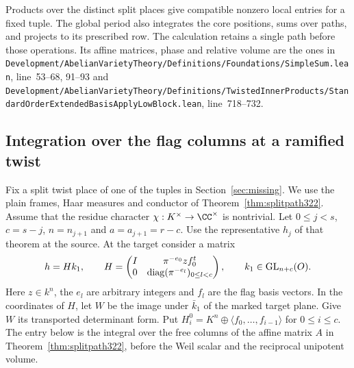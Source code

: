 \documentclass[a4paper,11pt]{article}
\theoremstyle{definition}
\theoremstyle{remark}
\newcommand{\srcloc}[2]{{\small\nolinkurl{#1.lean}}, line~#2}
\numberwithin{equation}{section}
\begin{document}
Products over the distinct split places give compatible
nonzero local entries for a fixed tuple. The global period
also integrates the core positions, sums over paths, and
projects to its prescribed row. The calculation retains a
single path before those operations. Its affine matrices,
phase and relative volume are the ones in
\srcloc{Development/AbelianVarietyTheory/Definitions/Foundations/SimpleSum}{53--68, 91--93}
and \srcloc{Development/AbelianVarietyTheory/Definitions/TwistedInnerProducts/StandardOrderExtendedBasisApplyLowBlock}{718--732}.

\subsection{Integration over the flag columns at a ramified twist}\label{nav:VI-66}
Fix a split twist place of one of the tuples in
Section~\ref{sec:missing}. We use the plain frames, Haar
measures and conductor of Theorem~\ref{thm:splitpath322}.
Assume that the residue character \(\chi:K^\times\to\CC^\times\)
is nontrivial. Let \(0\le j<s\), \(c=s-j\), \(n=n_{j+1}\)
and \(a=a_{j+1}=r-c\). Use the representative \(h_j\) of
that theorem at the source. At the target consider a matrix
\[
 h=H k_1,\qquad
 H=\begin{pmatrix}I&\pi^{-e_0}z f_0^t\\
                 0&\operatorname{diag}(\pi^{-e_l})_{0\le l<c}
   \end{pmatrix},\qquad k_1\in{\rm GL}_{n+c}(O).
\]
Here \(z\in k^n\), the \(e_l\) are arbitrary integers and
\(f_l\) are the flag basis vectors. In the coordinates of
\(H\), let \(W\) be the image under \(\bar k_1\) of the
marked target plane. Give \(W\) its transported determinant
form. Put \(H_i^0=K^n\oplus\langle f_0,\ldots,f_{i-1}\rangle\)
for \(0\le i\le c\). The entry below is the integral over the
free columns of the affine matrix \(A\) in
Theorem~\ref{thm:splitpath322}, before the Weil scalar and
the reciprocal unipotent volume.
\end{document}
